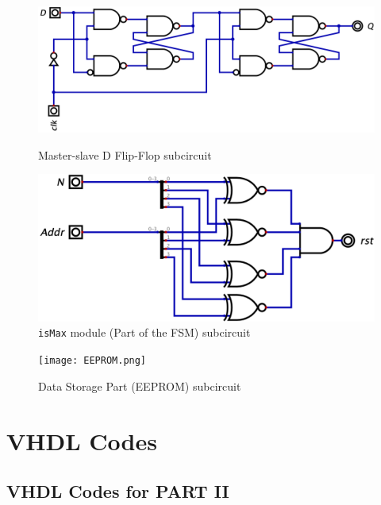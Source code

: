 \documentclass[11pt]{article}
\begin{document}
\begin{appendix}
\begin{figure}[h!]
	\centering
	\begin{minipage}{0.52\textwidth}
		\centering
		\includegraphics[width=\textwidth]{Dff.png}
		\caption{Master-slave D Flip-Flop subcircuit}
		\label{fig:Dff}
	\end{minipage}
	\hfill
	\begin{minipage}{0.45\textwidth}
		\centering
		\includegraphics[width=\textwidth]{isMax.png}
		\caption{\texttt{isMax} module (Part of the FSM) subcircuit}
		\label{fig:isMax}
	\end{minipage}
\end{figure}

\begin{figure}[h!]
	\centering
	\texttt{[image: EEPROM.png]}
	\caption{Data Storage Part (EEPROM) subcircuit}
	\label{fig:EEPROM}
\end{figure}


\clearpage
\section{VHDL Codes}
\label{app:c}

\subsection{VHDL Codes for PART II}


\end{appendix}
\end{document}
